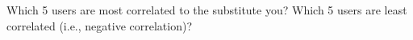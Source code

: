 Which 5 users are most correlated to the substitute you? Which
5 users are least correlated (i.e., negative correlation)?